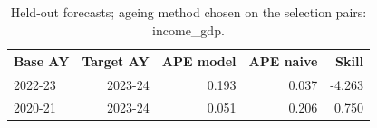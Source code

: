 \begin{table}[t]
\centering\small
\caption{Held-out forecasts; ageing method chosen on the selection pairs: income_gdp.}
\label{tab:backtest_forecast}
\begin{tabular}{lrrrr}
\toprule
Base AY & Target AY & APE model & APE naive & Skill \\
\midrule
2022-23 & 2023-24 & 0.193 & 0.037 & -4.263 \\
2020-21 & 2023-24 & 0.051 & 0.206 & 0.750 \\
\bottomrule
\end{tabular}
\end{table}
